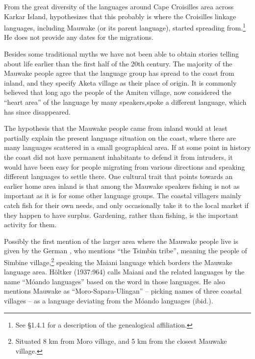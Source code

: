 From the great diversity of the languages around Cape Croisilles area across Karkar Island, \citet[27]{Ross1996} hypothesizes that this probably is where the Croisilles linkage languages, including Mauwake (or its parent language), started spreading from.\footnote{See {\S}1.4.1 for a description of the genealogical affiliation. }  He does not provide any dates for the migrations.

Besides some traditional myths we have not been able to obtain stories telling about life earlier than the first half of the 20th century.  The majority of the Mauwake people agree that the language group has spread to the coast from inland, and they specify Aketa village as their place of origin. It is commonly believed that long ago the people of the Amiten village, now considered the ``heart area'' of the language by many speakers,spoke a different language, which has since disappeared. 

The hypothesis that the Mauwake people came from inland would at least partially explain the present language situation on the coast, where there are many languages scattered in a small geographical area. If at some point in history the coast did not have permanent inhabitants to defend it from intruders, it would have been easy for people migrating from various directions and speaking different languages to settle there. One cultural trait that points towards an earlier home area inland is that among the Mauwake speakers fishing is not as important as it is for some other language groups. The coastal villagers mainly catch fish for their own needs, and only occasionally take it to the local market if they happen to have surplus. Gardening, rather than fishing, is the important activity for them.

Possibly the first mention of the larger area where the Mauwake people live is given by the German \citet[338]{Hollrung1888}, who mentions ``the Tsimbin tribe'', meaning the people of Simbine village,\footnote{Situated 8 km from Moro village, and 5 km from the closest Mauwake village.} speaking the Maiani language which borders the Mauwake language area. H\"oltker (1937:964) calls Maiani and the related languages by the name ``M\'oando languages'' based on the word  in those languages.  He also mentions Mauwake as ``Moro-Sapara-Ulingan'' -- picking names of three coastal villages -- as a language deviating from the M\'oando languages (ibid.). 

